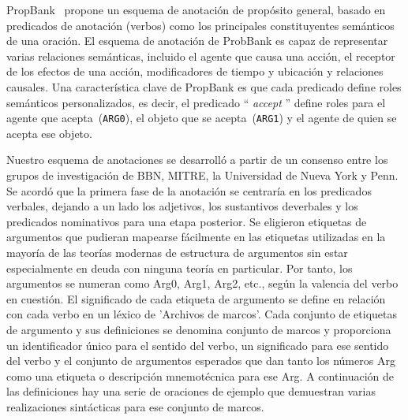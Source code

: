 PropBank~\cite{propbank} propone un esquema de anotación de propósito general, basado en predicados de anotación (verbos) como los principales constituyentes semánticos de una oración. El esquema de anotación de ProbBank es capaz de representar varias relaciones semánticas, incluido el agente que causa una acción, el receptor de los efectos de una acción, modificadores de tiempo y ubicación y relaciones causales.
Una característica clave de PropBank es que cada predicado define roles semánticos personalizados, es decir, el predicado `` \textit{accept} '' define roles para el agente que acepta~(\texttt{ARG0}), el objeto que se acepta~(\texttt{ARG1}) y el agente de quien se acepta ese objeto.

Nuestro esquema de anotaciones se desarrolló a partir de un consenso entre los grupos de investigación de BBN, MITRE, la Universidad de Nueva York y Penn. Se acordó que la primera fase de la anotación se centraría en los predicados verbales, dejando a un lado los adjetivos, los sustantivos deverbales y los predicados nominativos para una etapa posterior.
Se eligieron etiquetas de argumentos que pudieran mapearse fácilmente en las etiquetas utilizadas en la mayoría de las teorías modernas de estructura de argumentos sin estar especialmente en deuda con ninguna teoría en particular.
Por tanto, los argumentos se numeran como Arg0, Arg1, Arg2, etc., según la valencia del verbo en cuestión. El significado de cada etiqueta de argumento se define en relación con cada verbo en un léxico de 'Archivos de marcos'. Cada conjunto de etiquetas de argumento y sus definiciones se denomina conjunto de marcos y proporciona un identificador único para el sentido del verbo, un significado para ese sentido del verbo y el conjunto de argumentos esperados que dan tanto los números Arg como una etiqueta o descripción mnemotécnica para ese Arg.
A continuación de las definiciones hay una serie de oraciones de ejemplo que demuestran varias realizaciones sintácticas para ese conjunto de marcos.

